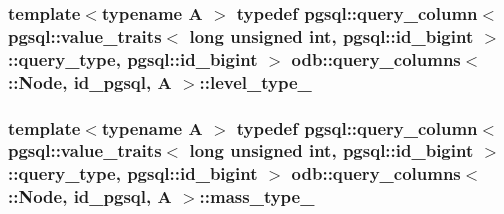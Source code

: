 \subsubsection[{level\+\_\+type\+\_\+}]{\setlength{\rightskip}{0pt plus 5cm}template$<$typename A $>$ typedef pgsql\+::query\+\_\+column$<$ pgsql\+::value\+\_\+traits$<$ long unsigned int, pgsql\+::id\+\_\+bigint $>$\+::query\+\_\+type, pgsql\+::id\+\_\+bigint $>$ odb\+::query\+\_\+columns$<$ \+::{\bf Node}, id\+\_\+pgsql, A $>$\+::{\bf level\+\_\+type\+\_\+}}\label{structodb_1_1query__columns_3_01_1_1_node_00_01id__pgsql_00_01_a_01_4_a23b6e7e1613f6c49d22ed865945c6325}
\hypertarget{structodb_1_1query__columns_3_01_1_1_node_00_01id__pgsql_00_01_a_01_4_aa2d823f900ade5bc0cd5bb6847e7e72c}{}
\subsubsection[{mass\+\_\+type\+\_\+}]{\setlength{\rightskip}{0pt plus 5cm}template$<$typename A $>$ typedef pgsql\+::query\+\_\+column$<$ pgsql\+::value\+\_\+traits$<$ long unsigned int, pgsql\+::id\+\_\+bigint $>$\+::query\+\_\+type, pgsql\+::id\+\_\+bigint $>$ odb\+::query\+\_\+columns$<$ \+::{\bf Node}, id\+\_\+pgsql, A $>$\+::{\bf mass\+\_\+type\+\_\+}}\label{structodb_1_1query__columns_3_01_1_1_node_00_01id__pgsql_00_01_a_01_4_aa2d823f900ade5bc0cd5bb6847e7e72c}
\hypertarget{structodb_1_1query__columns_3_01_1_1_node_00_01id__pgsql_00_01_a_01_4_a194b9a9f3e09f3fbfada9a59bc80ade3}{}
